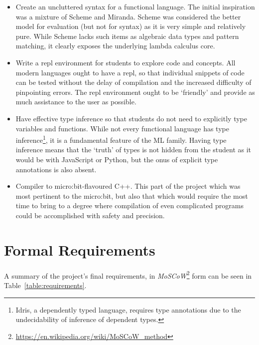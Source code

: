 \documentclass[12pt, a4paper]{report}
\begin{document}
\begin{itemize}
    \item Create an uncluttered syntax for a functional language. The initial inspiration was a
        mixture of Scheme and Miranda. Scheme was considered the better model for evaluation (but
        not for syntax) as it is very simple and relatively pure. While Scheme lacks such items as algebraic data types
        and pattern matching, it clearly exposes the underlying lambda calculus core.
    \item Write a repl environment for students to explore code and concepts. All modern languages
        ought to have a repl, so that individual snippets of code can be tested without the delay of
        compilation and the increased difficulty of pinpointing errors. The repl environment ought
        to be `friendly' and provide as much assistance to the user as possible. 
    \item Have effective type inference so that students do not need to explicitly type variables
        and functions. While not every functional language has type inference\footnote{Idris, a
        dependently typed language, requires type annotations due to the undecidability of inference of
        dependent types.}, it is a fundamental feature of the ML family. Having type inference means
        that the `truth' of types is not hidden from the student as it would be with JavaScript or
        Python, but the onus of explicit type annotations is also absent.
    \item Compiler to micro:bit-flavoured C++. This part of the project which was most
        pertinent to the micro:bit, but also that which would require the most time to bring to a
        degree where compilation of even complicated programs could be accomplished with safety and
        precision. 
\end{itemize}

\section{Formal Requirements}
\label{formalreq}
A summary of the project's final requirements, in
\textit{MoSCoW}\footnote{\url{https://en.wikipedia.org/wiki/MoSCoW_method}} form
can be seen in Table~\ref{table:requirements}. 
\end{document}

